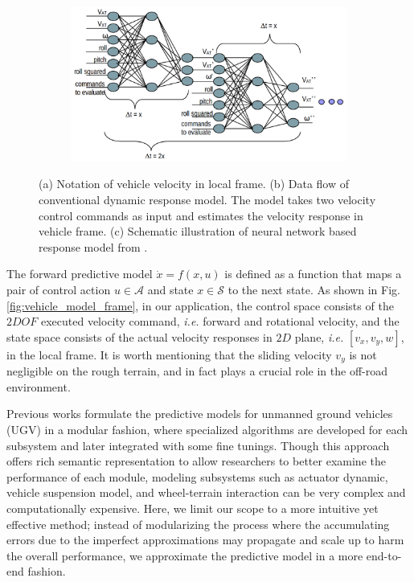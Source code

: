 \documentclass[../thesis.tex]{subfiles}
\begin{document}
\begin{figure}[t]
\begin{subfigure}[b]{0.8\linewidth}
    	 \includegraphics[width=\columnwidth]{./RRTPlanner/fig/neuralnet_model.png}
           	\subcaption{}
           	\label{fig:vehicle_model_net}
    	\end{subfigure}
    	\caption{(a) Notation of vehicle velocity in local frame. (b) Data flow of conventional dynamic response model. The model takes two velocity control commands as input and estimates the velocity response in vehicle frame. (c) Schematic illustration of neural network based response model from \cite{bode2007learning}.}
	\label{fig:vehicle_model}
\end{figure}
 
 
The forward predictive model $\dot{x}=f(x,u)$ is defined as a function that maps a pair of control action $u \in \mathcal{A}$ and state $x \in \mathcal{S}$ to the next state. 
As shown in Fig. \ref{fig:vehicle_model_frame}, in our application, the control space consists of the $2DOF$ executed velocity command, \textit{i.e.} forward and rotational velocity, and the state space consists of the actual velocity responses in $2D$ plane, \textit{i.e.} $[v_x, v_y, w]$, in the local frame. 
It is worth mentioning that the sliding velocity $v_y$ is not negligible on the rough terrain, and in fact plays a crucial role in the off-road environment.
 
 
Previous works \cite{kelly2007terrain,howard2006trajectory,howard2005terrain} formulate the predictive models for unmanned ground vehicles (UGV) in a modular fashion, where specialized algorithms are developed for each subsystem and later integrated with some fine tunings. 
Though this approach offers rich semantic representation to allow researchers to better examine the performance of each module, modeling subsystems such as actuator dynamic, vehicle suspension model, and wheel-terrain interaction can be very complex and computationally expensive.
Here, we limit our scope to a more intuitive yet effective method; instead of modularizing the process where the accumulating errors due to the imperfect approximations may propagate and scale up to harm the overall performance, we approximate the predictive model in a more end-to-end fashion.
 
\end{document}
